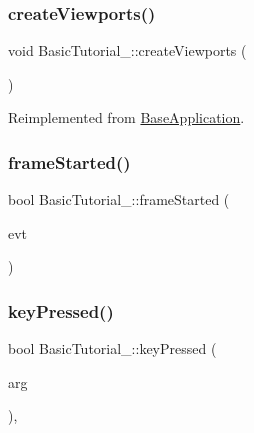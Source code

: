 \subsubsection{\texorpdfstring{create\+Viewports()}{createViewports()}}
{\footnotesize\ttfamily void Basic\+Tutorial\+\_\+::create\+Viewports (\begin{DoxyParamCaption}\item[{void}]{ }\end{DoxyParamCaption})\hspace{0.3cm}{\ttfamily [virtual]}}



Reimplemented from \mbox{\hyperlink{class_base_application_a1f8f6730cae6ec769d8730b1af48486e}{Base\+Application}}.

\mbox{\label{class_basic_tutorial__00_a94e281a96584a25bf57b1c5e73737c81}} 
\subsubsection{\texorpdfstring{frame\+Started()}{frameStarted()}}
{\footnotesize\ttfamily bool Basic\+Tutorial\+\_\+::frame\+Started (\begin{DoxyParamCaption}\item[{const Ogre\+::\+Frame\+Event \&}]{evt }\end{DoxyParamCaption})\hspace{0.3cm}{\ttfamily [virtual]}}

\mbox{\label{class_basic_tutorial__00_adc1a0b32d78b1980b3ee51a1b1e1e69b}} 
\subsubsection{\texorpdfstring{key\+Pressed()}{keyPressed()}}
{\footnotesize\ttfamily bool Basic\+Tutorial\+\_\+::key\+Pressed (\begin{DoxyParamCaption}\item[{const O\+I\+S\+::\+Key\+Event \&}]{arg }\end{DoxyParamCaption})\hspace{0.3cm}{\ttfamily [protected]}, {\ttfamily [virtual]}}



